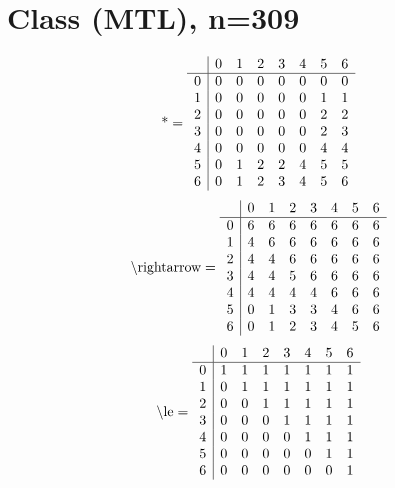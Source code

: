 \documentclass[11pt]{article}
\begin{document}
\section{Class (MTL), n=309}
\[\text{*} = 
\begin{array}{r | r r r r r r r}
 & 0 & 1 & 2 & 3 & 4 & 5 & 6 \\ \hline
0 & 0 & 0 & 0 & 0 & 0 & 0 & 0 \\
1 & 0 & 0 & 0 & 0 & 0 & 1 & 1 \\
2 & 0 & 0 & 0 & 0 & 0 & 2 & 2 \\
3 & 0 & 0 & 0 & 0 & 0 & 2 & 3 \\
4 & 0 & 0 & 0 & 0 & 0 & 4 & 4 \\
5 & 0 & 1 & 2 & 2 & 4 & 5 & 5 \\
6 & 0 & 1 & 2 & 3 & 4 & 5 & 6 \\
\end{array}
\]
\[\text{\textbackslash rightarrow} = 
\begin{array}{r | r r r r r r r}
 & 0 & 1 & 2 & 3 & 4 & 5 & 6 \\ \hline
0 & 6 & 6 & 6 & 6 & 6 & 6 & 6 \\
1 & 4 & 6 & 6 & 6 & 6 & 6 & 6 \\
2 & 4 & 4 & 6 & 6 & 6 & 6 & 6 \\
3 & 4 & 4 & 5 & 6 & 6 & 6 & 6 \\
4 & 4 & 4 & 4 & 4 & 6 & 6 & 6 \\
5 & 0 & 1 & 3 & 3 & 4 & 6 & 6 \\
6 & 0 & 1 & 2 & 3 & 4 & 5 & 6 \\
\end{array}
\]
\[\text{\textbackslash le} = 
\begin{array}{r | r r r r r r r}
 & 0 & 1 & 2 & 3 & 4 & 5 & 6 \\ \hline
0 & 1 & 1 & 1 & 1 & 1 & 1 & 1 \\
1 & 0 & 1 & 1 & 1 & 1 & 1 & 1 \\
2 & 0 & 0 & 1 & 1 & 1 & 1 & 1 \\
3 & 0 & 0 & 0 & 1 & 1 & 1 & 1 \\
4 & 0 & 0 & 0 & 0 & 1 & 1 & 1 \\
5 & 0 & 0 & 0 & 0 & 0 & 1 & 1 \\
6 & 0 & 0 & 0 & 0 & 0 & 0 & 1 \\
\end{array}
\]
\end{document}
